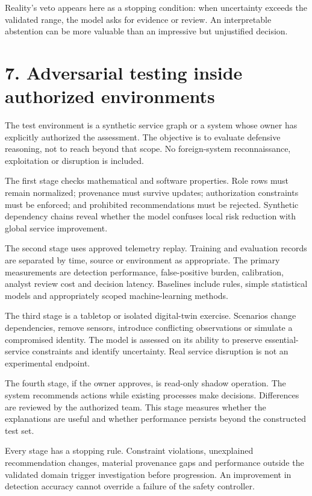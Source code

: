 \documentclass[11pt]{article}
\begin{document}
Reality's veto appears here as a stopping condition: when uncertainty exceeds the validated range, the model asks for evidence or review. An interpretable abstention can be more valuable than an impressive but unjustified decision.

\clearpage
\section*{7. Adversarial testing inside authorized environments}
The test environment is a synthetic service graph or a system whose owner has explicitly authorized the assessment. The objective is to evaluate defensive reasoning, not to reach beyond that scope. No foreign-system reconnaissance, exploitation or disruption is included.

The first stage checks mathematical and software properties. Role rows must remain normalized; provenance must survive updates; authorization constraints must be enforced; and prohibited recommendations must be rejected. Synthetic dependency chains reveal whether the model confuses local risk reduction with global service improvement.

The second stage uses approved telemetry replay. Training and evaluation records are separated by time, source or environment as appropriate. The primary measurements are detection performance, false-positive burden, calibration, analyst review cost and decision latency. Baselines include rules, simple statistical models and appropriately scoped machine-learning methods.

The third stage is a tabletop or isolated digital-twin exercise. Scenarios change dependencies, remove sensors, introduce conflicting observations or simulate a compromised identity. The model is assessed on its ability to preserve essential-service constraints and identify uncertainty. Real service disruption is not an experimental endpoint.

The fourth stage, if the owner approves, is read-only shadow operation. The system recommends actions while existing processes make decisions. Differences are reviewed by the authorized team. This stage measures whether the explanations are useful and whether performance persists beyond the constructed test set.

Every stage has a stopping rule. Constraint violations, unexplained recommendation changes, material provenance gaps and performance outside the validated domain trigger investigation before progression. An improvement in detection accuracy cannot override a failure of the safety controller.
\end{document}
